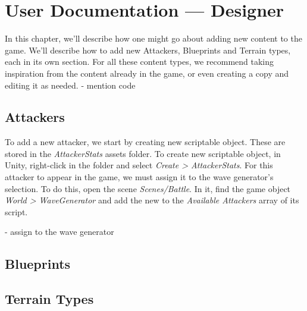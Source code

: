 \chapter{User Documentation --- Designer}

In this chapter, we'll describe how one might go about adding new content to the game.
We'll describe how to add new Attackers, Blueprints and Terrain types, each in its own section.
For all these content types, we recommend taking inspiration from the content already in the game, or even creating a copy and editing it as needed.
- mention code

\section{Attackers}

To add a new attacker, we start by creating new  scriptable object.
These are stored in the \emph{AttackerStats} assets folder.
To create new  scriptable object, in Unity, right-click in the folder and select \emph{Create > AttackerStats}.
For this attacker to appear in the game, we must assign it to the wave generator's selection.
To do this, open the scene \emph{Scenes/Battle}.
In it, find the game object \emph{World > WaveGenerator} and add the new  to the \emph{Available Attackers} array of its  script.



- assign to the wave generator

\section{Blueprints}

\section{Terrain Types}